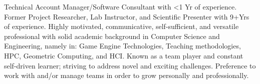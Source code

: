 

\begin{cvsummary}

Technical Account Manager/Software Consultant
with %
<1 Yr of experience.
Former Project Researcher, Lab Instructor, and Scientific Presenter with  9+Yrs of experience.
Highly motivated, communicative, self-sufficient, and versatile professional with solid academic background in Computer Science and Engineering, namely in: 
Game Engine Technologies, Teaching methodologies, HPC, Geometric Computing, and HCI.
Known as a team player %
and constant self-driven learner; 
striving to address novel and exciting challenges. %
Preference to work with and/or manage teams in order to grow personally and professionally.
\end{cvsummary}
